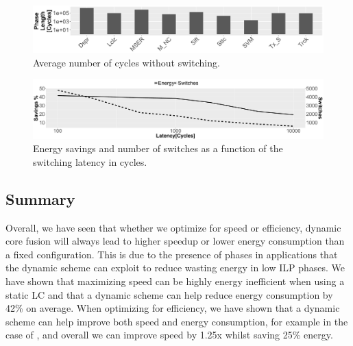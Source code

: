 \begin{figure}[t]
    \centering
	\includegraphics[width=\textwidth]{graphics/Exploration/phase_len.pdf}
\vspace*{-6mm}
    \caption{Average number of cycles without switching.}
    \label{fig:avlen}
\vspace{-2mm}
\end{figure}
\begin{figure}[t]
\centering
	\includegraphics[width=\textwidth]{graphics/Exploration/latency_en_sp_sw.pdf}
    \caption{Energy savings and number of switches as a function of the switching latency in cycles.}
    \label{fig:enlatency}
\vspace{5mm}
\end{figure}

\subsection{Summary}

Overall, we have seen that whether we optimize for speed or efficiency, dynamic core fusion will always lead to higher speedup or lower energy consumption than a fixed configuration.
This is due to the presence of phases in applications that the dynamic scheme can exploit to reduce wasting energy in low ILP phases.
We have shown that maximizing speed can be highly energy inefficient when using a static LC and that a dynamic scheme can help reduce energy consumption by 42\% on average.
When optimizing for efficiency, we have shown that a dynamic scheme can help improve both speed and energy consumption, for example in the case of , and overall we can improve speed by 1.25x whilst saving 25\% energy.

